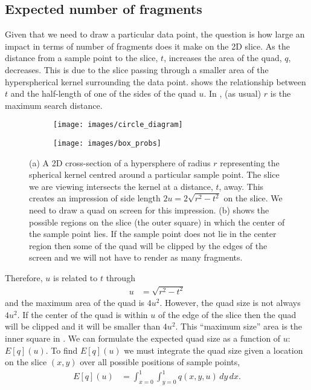 \subsection{Expected number of fragments}

Given that we need to draw a particular data point, the question is how large
an impact in terms of number of fragments does it make on the 2D slice. As the
distance from a sample point to the slice, $t$, increases the area of the 
quad, $q$, decreases. This is due to the slice passing through a smaller area 
of the
hyperspherical kernel surrounding the data point.  shows the
relationship between $t$ and the half-length of one of the sides of the 
quad $u$.  In , (as usual) $r$ is the maximum search distance.

\begin{figure}[htb]
\centering
\begin{subfigure}{0.4\textwidth}
  \texttt{[image: images/circle\_diagram]}
  \caption{
  }
  \label{fig:circle}
\end{subfigure}%
\begin{subfigure}{0.4\textwidth}
  \texttt{[image: images/box\_probs]}
  \caption{
  }
  \label{fig:quad_size}
\end{subfigure}
\caption[Kernel/slice interaction]{
  (a) A 2D cross-section of a hypersphere of radius $r$ representing 
  the spherical kernel 
  centred around a particular sample point.  The slice we are
  viewing intersects the kernel at a distance, $t$, away.  This 
  creates an impression of side length $2u = 2\sqrt{r^2-t^2}$ on the 
  slice.  We need to draw a quad on screen for this impression.
  (b) shows the possible regions on the slice (the outer square)
  in which the center of the sample point lies.  If the sample point
  does not lie in the center region then some of the quad will be clipped
  by the edges of the screen and we will not have to render as many 
  fragments.
}
\label{fig:appendix_geom}
\end{figure}

Therefore, $u$ is related to $t$ through
\begin{align}
  u &= \sqrt{r^2-t^2} \label{eq:u_to_t}
\end{align}
and the
maximum area of the quad is $4u^2$.  However, the quad size is not always
$4u^2$.   If the center of the quad is within $u$ of the edge of the slice
then the quad will be clipped and it will be smaller than $4u^2$.
This ``maximum size'' area is the inner square in .
We can formulate the expected quad size as a function of $u$: $E[q](u)$.
To find $E[q](u)$ we must integrate the quad size given a location on 
the slice $(x,y)$ over all possible positions of sample points,
\begin{align*}
  E[q](u) &= \int_{x=0}^1 \int_{y=0}^1 q(x, y, u) \, dy \, dx
  \text{.}
\end{align*}

